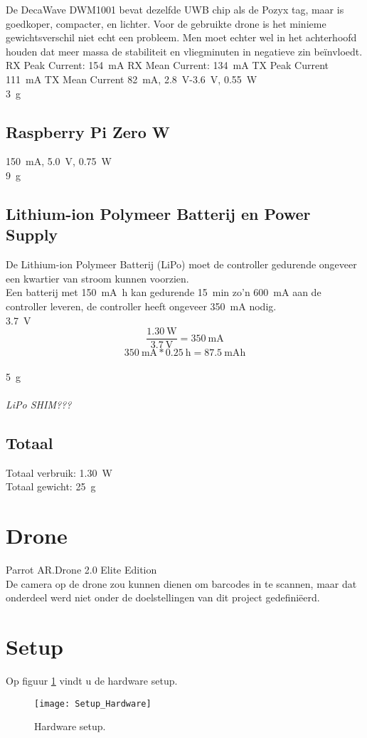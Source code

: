 De DecaWave DWM1001 bevat dezelfde UWB chip als de Pozyx tag, maar is goedkoper, compacter, en lichter. Voor de gebruikte drone is het minieme gewichtsverschil niet echt een probleem. Men moet echter wel in het achterhoofd houden dat meer massa de stabiliteit en vliegminuten in negatieve zin be\"invloedt.\\

RX Peak Current: \SI{154}{\mA} RX Mean Current: \SI{134}{\mA} TX Peak Current \SI{111}{\mA} TX Mean Current \SI{82}{mA}, \SI{2.8}{\V}-\SI{3.6}{\V}, \SI{0.55}{\W}\\
\SI{3}{\g}

\subsection{Raspberry Pi Zero W} \label{sec:raspberry_pi}
\SI{150}{\mA}, \SI{5.0}{\V}, \SI{0.75}{\W}\\
\SI{9}{\g}

\subsection{Lithium-ion Polymeer Batterij en Power Supply} \label{sec:lipo}
De Lithium-ion Polymeer Batterij (LiPo) moet de controller gedurende ongeveer een kwartier van stroom kunnen voorzien.\\
Een batterij met \SI{150}{\mA\hour} kan gedurende \SI{15}{\minute} zo'n \SI{600}{\mA} aan de controller leveren, de controller heeft ongeveer \SI{350}{\mA} nodig.\\
\SI{3.7}{\V}
\[\frac{\SI{1.30}{\W}}{\SI{3.7}{\V}}=\SI{350}{\mA}\]
\[\SI{350}{\mA}*\SI{0.25}{\hour}=\SI{87.5}{\mA\hour}\]\\
\SI{5}{\g}\\
\\
\textit{LiPo SHIM???}

\subsection{Totaal} \label{sec:totaal}
Totaal verbruik: \SI{1.30}{\W}\\
Totaal gewicht: \SI{25}{\g}

\section{Drone} \label{sec:drone}
Parrot AR.Drone 2.0 Elite Edition\\

De camera op de drone zou kunnen dienen om barcodes in te scannen, maar dat onderdeel werd niet onder de doelstellingen van dit project gedefini\"eerd.

\section{Setup} \label{sec:setup_hardware}
Op figuur \ref{fig:setup_hardware} vindt u de hardware setup.
\begin{figure}[p]
	\centering
	\texttt{[image: Setup\_Hardware]}
	\caption[Hardware setup]{Hardware setup.}
	\label{fig:setup_hardware}
\end{figure}
